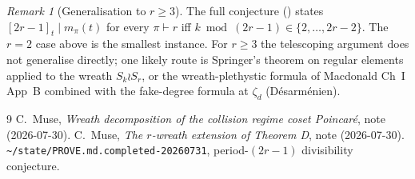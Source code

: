 \documentclass[11pt]{article}
\theoremstyle{definition}
\theoremstyle{remark}
\newtheorem*{remark}{Remark}
\begin{document}
\begin{remark}[Generalisation to $r \ge 3$]
The full conjecture (\cite{PROVE-2026-07-31}) states
$[2r-1]_t \mid m_\pi(t)$ for every $\pi \vdash r$ iff
$k \bmod (2r-1) \in \{2, \ldots, 2r-2\}$. The $r = 2$ case above is the
smallest instance. For $r \ge 3$ the telescoping argument does not
generalise directly; one likely route is Springer's theorem on regular
elements applied to the wreath $S_k \wr S_r$, or the wreath-plethystic
formula of Macdonald Ch~I App~B combined with the fake-degree formula at
$\zeta_d$ (Désarménien).
\end{remark}


\begin{thebibliography}{9}
 C.\ Muse, \emph{Wreath decomposition of the collision
regime coset Poincar\'e}, note (2026-07-30).
 C.\ Muse, \emph{The $r$-wreath extension of
Theorem D}, note (2026-07-30).
 \texttt{\~{}/state/PROVE.md.completed-20260731},
period-$(2r-1)$ divisibility conjecture.
\end{thebibliography}
\end{document}
